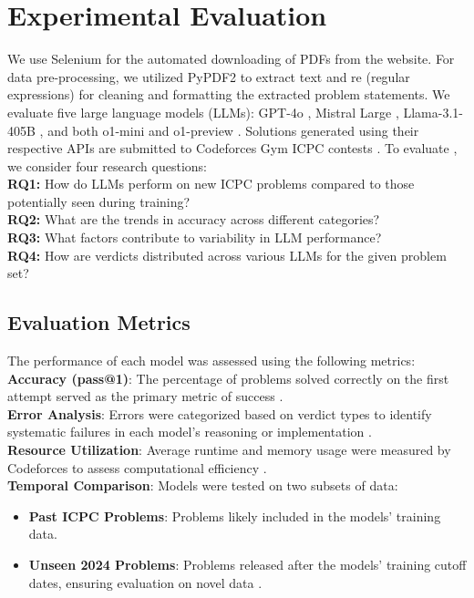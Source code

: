 \section{Experimental Evaluation}
We use Selenium\cite{b21} for the automated downloading of PDFs from the website. For data pre-processing, we utilized PyPDF2\cite{b22} to extract text and re (regular expressions)\cite{b23} for cleaning and formatting the extracted problem statements. We evaluate five large language models (LLMs): GPT-4o \cite{b27}, Mistral Large \cite{b11}, Llama-3.1-405B \cite{b10}, and both o1-mini and o1-preview \cite{b4}. Solutions\cite{b25} generated using their respective APIs \cite{b9} are submitted to Codeforces Gym ICPC contests \cite{b8}. To evaluate \Name{}, we consider four research questions:\\
\textbf{RQ1:} How do LLMs perform on new ICPC problems
compared to those potentially seen during training?\\
\textbf{RQ2:} What are the trends in accuracy across different
categories?\\
\textbf{RQ3:} What factors contribute to variability in LLM performance?\\
\textbf{RQ4:} How are verdicts distributed across various LLMs
for the given problem set?

\subsection{Evaluation Metrics}
The performance of each model was assessed using the following metrics:\\
\textbf{Accuracy (pass@1)}: The percentage of problems solved correctly on the first attempt served as the primary metric of success \cite{b1,b2}.\\
\textbf{Error Analysis}: Errors were categorized based on verdict types to identify systematic failures in each model's reasoning or implementation \cite{b27}.\\
\textbf{Resource Utilization}: Average runtime and memory usage were measured by Codeforces to assess computational efficiency \cite{b4}.\\
\textbf{Temporal Comparison}: Models were tested on two subsets of data:
    \begin{itemize}
        \item \textbf{Past ICPC Problems}: Problems likely included in the models’ training data.
        \item \textbf{Unseen 2024 Problems}: Problems released after the models' training cutoff dates, ensuring evaluation on novel data \cite{b2,b27}.
    \end{itemize}

